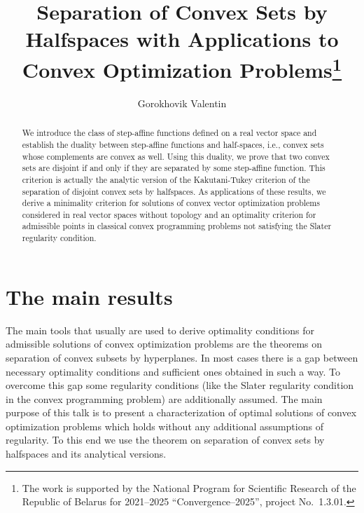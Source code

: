\documentclass[12pt]{llncs}
\begin{document}
\fi

\title{Separation of Convex Sets by Halfspaces with Applications to Convex Optimization Problems\thanks{The work is supported by the National Program for Scientific Research of
the Republic of Belarus for 2021--2025 ``Convergence--2025'', project No.~1.3.01.}}
\author{Gorokhovik Valentin}
  

  
\maketitle

\begin{abstract}
We introduce the class of step-affine functions defined on a real vector space and establish the duality
between step-affine functions and half-spaces, i.e., convex sets whose complements are convex as well. Using
this duality, we prove that two convex sets are disjoint if and only if they are separated by some step-affine
function. This criterion is actually the analytic version of the Kakutani-Tukey criterion of the separation of
disjoint convex sets by halfspaces. As applications of these results, we derive a minimality criterion for solutions
of convex vector optimization problems considered in real vector spaces without topology and an optimality
criterion for admissible points in classical convex programming problems not satisfying the Slater regularity
condition.

\end{abstract}

\section{The main results}

The main tools that usually are used to derive optimality
conditions for admissible solutions of convex optimization
problems are the theorems on separation of convex subsets by
hyper\-pla\-nes. In most cases there is a gap between necessary
optimality conditions and sufficient ones obtained in such a way.
To overcome this gap some regularity conditions (like the Slater
regularity condition in the convex programming problem) are
additionally assumed. The main purpose of this talk is to present
a characterization of optimal solutions of convex optimization
problems which holds without any additional assumptions of
regularity. To this end we use the theorem on separation of convex
sets by halfspaces and its analytical versions.
\end{document}
